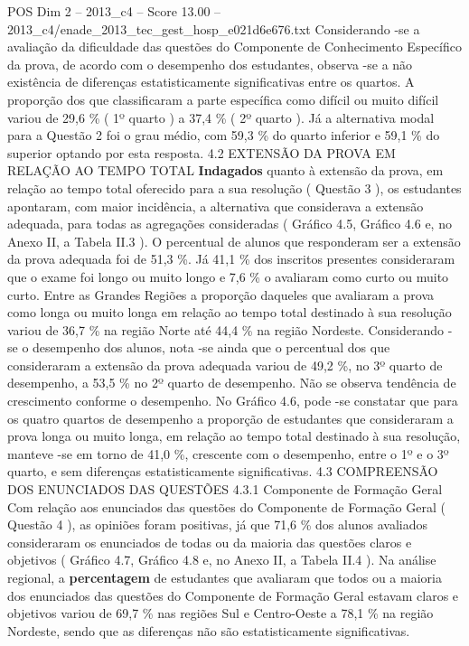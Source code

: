 \begin{textsample}{POS Dim 2 – 2013\_c4 – Score 13.00 – 2013\_c4/enade\_2013\_tec\_gest\_hosp\_e021d6e676.txt}
Considerando -se a avaliação da dificuldade das questões do Componente de Conhecimento Específico da prova, de acordo com o desempenho dos estudantes, observa -se a não existência de diferenças estatisticamente significativas entre os quartos.
A proporção dos que classificaram a parte específica como difícil ou muito difícil variou de 29,6 \% ( 1º quarto ) a 37,4 \% ( 2º quarto ).
Já a alternativa modal para a Questão 2 foi o grau médio, com 59,3 \% do quarto inferior e 59,1 \% do superior optando por esta resposta. 4.2 EXTENSÃO DA PROVA EM RELAÇÃO AO TEMPO TOTAL \textbf{Indagados} quanto à extensão da prova, em relação ao tempo total oferecido para a sua resolução ( Questão 3 ), os estudantes apontaram, com maior incidência, a alternativa que considerava a extensão adequada, para todas as agregações consideradas ( Gráfico 4.5, Gráfico 4.6 e, no Anexo II, a Tabela II.3 ).
O percentual de alunos que responderam ser a extensão da prova adequada foi de 51,3 \%.
Já 41,1 \% dos inscritos presentes consideraram que o exame foi longo ou muito longo e 7,6 \% o avaliaram como curto ou muito curto.
Entre as Grandes Regiões a proporção daqueles que avaliaram a prova como longa ou muito longa em relação ao tempo total destinado à sua resolução variou de 36,7 \% na região Norte até 44,4 \% na região Nordeste.
Considerando -se o desempenho dos alunos, nota -se ainda que o percentual dos que consideraram a extensão da prova adequada variou de 49,2 \%, no 3º quarto de desempenho, a 53,5 \% no 2º quarto de desempenho.
Não se observa tendência de crescimento conforme o desempenho.
No Gráfico 4.6, pode -se constatar que para os quatro quartos de desempenho a proporção de estudantes que consideraram a prova longa ou muito longa, em relação ao tempo total destinado à sua resolução, manteve -se em torno de 41,0 \%, crescente com o desempenho, entre o 1º e o 3º quarto, e sem diferenças estatisticamente significativas. 4.3 COMPREENSÃO DOS ENUNCIADOS DAS QUESTÕES 4.3.1 Componente de Formação Geral Com relação aos enunciados das questões do Componente de Formação Geral ( Questão 4 ), as opiniões foram positivas, já que 71,6 \% dos alunos avaliados consideraram os enunciados de todas ou da maioria das questões claros e objetivos ( Gráfico 4.7, Gráfico 4.8 e, no Anexo II, a Tabela II.4 ).
Na análise regional, a \textbf{percentagem} de estudantes que avaliaram que todos ou a maioria dos enunciados das questões do Componente de Formação Geral estavam claros e objetivos variou de 69,7 \% nas regiões Sul e Centro-Oeste a 78,1 \% na região Nordeste, sendo que as diferenças não são estatisticamente significativas.

\end{textsample}
